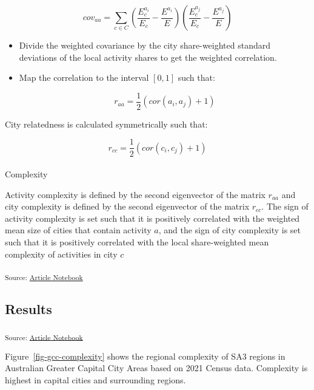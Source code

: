 \documentclass[
  number]{elsarticle}
\makeatletter
\let\oldparagraph\paragraph
\renewcommand{\paragraph}{
    \@ifstar
      \xxxParagraphStar
      \xxxParagraphNoStar
  }
\newcommand{\xxxParagraphStar}[1]{\oldparagraph*{#1}\mbox{}}
\newcommand{\xxxParagraphNoStar}[1]{\oldparagraph{#1}\mbox{}}
\makeatother
\begin{document}
\[
cov_{aa} = \sum_{c \in C} (\frac{E_c^{a_i}}{E_c}-\frac{E^{a_i}}{E})(\frac{E_c^{a_j}}{E_c}-\frac{E^{a_j}}{E})
\]

\begin{itemize}
\item
  Divide the weighted covariance by the city share-weighted standard
  deviations of the local activity shares to get the weighted
  correlation.
\item
  Map the correlation to the interval \([0,1]\) such that:

  \[
  r_{aa} = \frac{1}{2}(cor(a_i, a_j) + 1)
  \]
\end{itemize}

City relatedness is calculated symmetrically such that:

\[
r_{cc} = \frac{1}{2}(cor(c_i, c_j) + 1)
\]

\paragraph{Complexity}\label{complexity}

Activity complexity is defined by the second eigenvector of the matrix
\(r_{aa}\) and city complexity is defined by the second eigenvector of
the matrix \(r_{cc}\). The sign of activity complexity is set such that
it is positively correlated with the weighted mean size of cities that
contain activity \(a\), and the sign of city complexity is set such that
it is positively correlated with the local share-weighted mean
complexity of activities in city \(c\)

\textsubscript{Source:
\href{https://aiti-flinders.github.io/sirp-complexity/index.qmd.html}{Article
Notebook}}

\subsection{Results}\label{results}

\textsubscript{Source:
\href{https://aiti-flinders.github.io/sirp-complexity/index.qmd.html}{Article
Notebook}}

Figure~\ref{fig-gcc-complexity} shows the regional complexity of SA3
regions in Australian Greater Capital City Areas based on 2021 Census
data. Complexity is highest in capital cities and surrounding regions.
\end{document}
